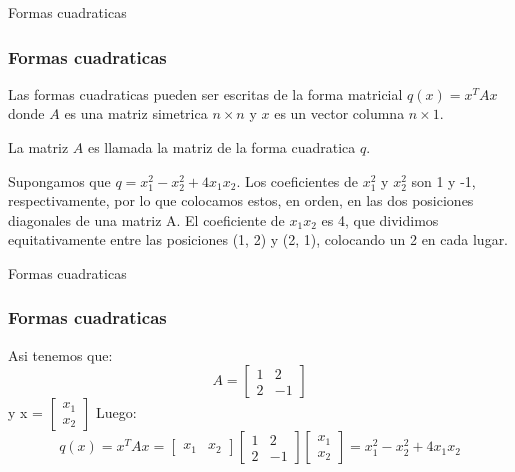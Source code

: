 \documentclass[xcolor={dvipsnames},aspectratio=169,10pt]{beamer}
\begin{document}
\begin{frame}{Formas cuadraticas}
  \frametitle{Formas cuadraticas}
  Las formas cuadraticas pueden ser escritas de la forma matricial $q(x) = x^{T}Ax$ donde $A$ es una matriz simetrica $n 
  \times n$ y $x$ es un vector columna $n \times 1$.

  La matriz $A$ es llamada la matriz de la forma cuadratica $q$.

  \begin{example}
    Supongamos que $q = x_1^2 - x_2^2 + 4x_1x_2$. Los coeficientes de $x_1^2$ y $x_2^2$ son 1 y -1, 
    respectivamente, por lo que colocamos estos, en orden, en las dos posiciones diagonales de una matriz A. 
    El coeficiente de $x_1x_2$ es 4, que dividimos equitativamente entre las posiciones (1, 2) y (2, 1), 
    colocando un 2 en cada lugar.
  \end{example}
\end{frame}

\begin{frame}{Formas cuadraticas}
  \frametitle{Formas cuadraticas}
  Asi tenemos que:
  \begin{equation*}
    A = \begin{bmatrix}
      1 & 2 \\
      2 & -1
    \end{bmatrix}
  \end{equation*}
  y x = $\begin{bmatrix}
    x_1 \\
    x_2
  \end{bmatrix}$
  Luego:
  \begin{equation*}
    q(x) = x^{T}Ax = \begin{bmatrix}
      x_1 & x_2
    \end{bmatrix}
    \begin{bmatrix}
      1 & 2 \\
      2 & -1
    \end{bmatrix}
    \begin{bmatrix}
      x_1 \\
      x_2
    \end{bmatrix}
    = x_1^2 - x_2^2 + 4x_1x_2
  \end{equation*}
\end{frame}
\end{document}
